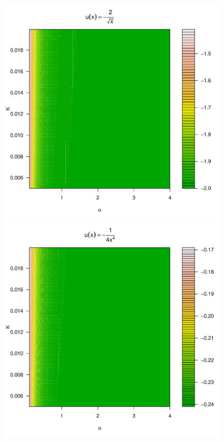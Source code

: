 \begin{figure}[htb!]
\begin{minipage}{0.25\linewidth}
  \end{minipage}\hfill
  \begin{minipage}{0.25\linewidth}
    \includegraphics[width=\textwidth]{preference_pareto5e-1.pdf}
  \end{minipage}\hfill
  \begin{minipage}{0.25\linewidth}
    \includegraphics[width=\textwidth]{preference_pareto4.pdf}

\end{minipage}
\end{figure}
